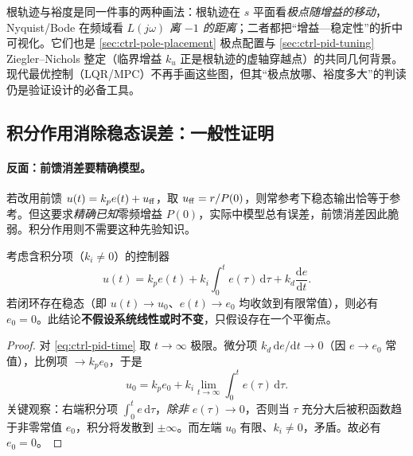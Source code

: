 \begin{insight}
根轨迹与裕度是同一件事的两种画法：根轨迹在 $s$ 平面看\emph{极点随增益的移动}，Nyquist/Bode 在频域看 $L(j\omega)$ \emph{离 $-1$ 的距离}；二者都把“增益—稳定性”的折中可视化。它们也是 \cref{sec:ctrl-pole-placement} 极点配置与 \cref{sec:ctrl-pid-tuning} Ziegler--Nichols 整定（临界增益 $k_u$ 正是根轨迹的虚轴穿越点）的共同几何背景。现代最优控制（LQR/MPC）不再手画这些图，但其“极点放哪、裕度多大”的判读仍是验证设计的必备工具。
\end{insight}

\subsection{积分作用消除稳态误差：一般性证明}
\label{sec:ctrl-integral-magic}

\paragraph{反面：前馈消差要精确模型。}
若改用前馈 $u(t)=k_pe(t)+u_{\rm ff}$，取 $u_{\rm ff}=r/P(0)$，则常参考下稳态输出恰等于参考\cite{astrom2008feedback}。但这要求\emph{精确已知}零频增益 $P(0)$，实际中模型总有误差，前馈消差因此脆弱。积分作用则不需要这种先验知识。

\begin{theorem}[积分作用消除稳态误差]
\label{thm:ctrl-integral}
考虑含积分项（$k_i\neq0$）的控制器
\begin{equation}
  u(t)=k_pe(t)+k_i\int_0^t e(\tau)\,\mathrm d\tau+k_d\frac{\mathrm de}{\mathrm dt}.
  \label{eq:ctrl-pid-time}
\end{equation}
若闭环存在稳态（即 $u(t)\to u_0$、$e(t)\to e_0$ 均收敛到有限常值），则必有 $e_0=0$。此结论\textbf{不假设系统线性或时不变}，只假设存在一个平衡点。
\end{theorem}
\begin{proof}
对 \cref{eq:ctrl-pid-time} 取 $t\to\infty$ 极限。微分项 $k_d\,\mathrm de/\mathrm dt\to0$（因 $e\to e_0$ 常值），比例项 $\to k_pe_0$，于是
\begin{equation}
  u_0=k_pe_0+k_i\lim_{t\to\infty}\int_0^t e(\tau)\,\mathrm d\tau.
  \label{eq:ctrl-integral-limit}
\end{equation}
关键观察：右端积分项 $\int_0^t e\,\mathrm d\tau$，\emph{除非} $e(\tau)\to0$，否则当 $\tau$ 充分大后被积函数趋于非零常值 $e_0$，积分将发散到 $\pm\infty$。而左端 $u_0$ 有限、$k_i\neq0$，矛盾。故必有 $e_0=0$。
\end{proof}

